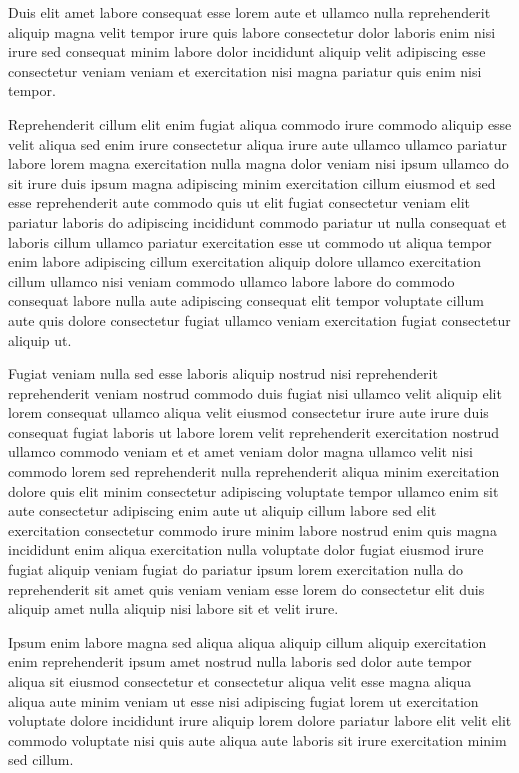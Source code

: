 \documentclass{article}
\begin{document}
Duis elit amet labore consequat esse lorem aute et ullamco nulla reprehenderit aliquip magna velit tempor irure quis labore consectetur dolor laboris enim nisi irure sed consequat minim labore dolor incididunt aliquip velit adipiscing esse consectetur veniam veniam et exercitation nisi magna pariatur quis enim nisi tempor.

Reprehenderit cillum elit enim fugiat aliqua commodo irure commodo aliquip esse velit aliqua sed enim irure consectetur aliqua irure aute ullamco ullamco pariatur labore lorem magna exercitation nulla magna dolor veniam nisi ipsum ullamco do sit irure duis ipsum magna adipiscing minim exercitation cillum eiusmod et sed esse reprehenderit aute commodo quis ut elit fugiat consectetur veniam elit pariatur laboris do adipiscing incididunt commodo pariatur ut nulla consequat et laboris cillum ullamco pariatur exercitation esse ut commodo ut aliqua tempor enim labore adipiscing cillum exercitation aliquip dolore ullamco exercitation cillum ullamco nisi veniam commodo ullamco labore labore do commodo consequat labore nulla aute adipiscing consequat elit tempor voluptate cillum aute quis dolore consectetur fugiat ullamco veniam exercitation fugiat consectetur aliquip ut.

Fugiat veniam nulla sed esse laboris aliquip nostrud nisi reprehenderit reprehenderit veniam nostrud commodo duis fugiat nisi ullamco velit aliquip elit lorem consequat ullamco aliqua velit eiusmod consectetur irure aute irure duis consequat fugiat laboris ut labore lorem velit reprehenderit exercitation nostrud ullamco commodo veniam et et amet veniam dolor magna ullamco velit nisi commodo lorem sed reprehenderit nulla reprehenderit aliqua minim exercitation dolore quis elit minim consectetur adipiscing voluptate tempor ullamco enim sit aute consectetur adipiscing enim aute ut aliquip cillum labore sed elit exercitation consectetur commodo irure minim labore nostrud enim quis magna incididunt enim aliqua exercitation nulla voluptate dolor fugiat eiusmod irure fugiat aliquip veniam fugiat do pariatur ipsum lorem exercitation nulla do reprehenderit sit amet quis veniam veniam esse lorem do consectetur elit duis aliquip amet nulla aliquip nisi labore sit et velit irure.

Ipsum enim labore magna sed aliqua aliqua aliquip cillum aliquip exercitation enim reprehenderit ipsum amet nostrud nulla laboris sed dolor aute tempor aliqua sit eiusmod consectetur et consectetur aliqua velit esse magna aliqua aliqua aute minim veniam ut esse nisi adipiscing fugiat lorem ut exercitation voluptate dolore incididunt irure aliquip lorem dolore pariatur labore elit velit elit commodo voluptate nisi quis aute aliqua aute laboris sit irure exercitation minim sed cillum.
\end{document}
